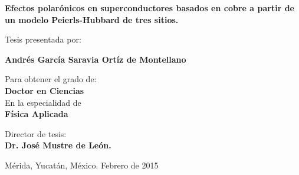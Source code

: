 \bs\bs\bs\bs
\begin{center}
  {\large \bf \bs \bf 
    \hspace{-2.8cm}
    \textsf{Efectos polarónicos en superconductores basados en cobre a partir de un modelo Peierls-Hubbard de tres sitios.}}
\end{center}
\bs\bs\bs
\begin{center}
  {\large 
    \hspace{-2.8cm}
    \textsf{Tesis presentada por:}}
\end{center}
\bs\bs
\begin{center}
  {\large \bf 
    \hspace{-2.8cm}
    \textsf{Andrés García Saravia Ortíz de Montellano}} 
\end{center}
\bs
\begin{center} 
  {\large 
    \hspace{-2.8cm}
    \textsf{Para obtener el grado de:}} \\ 
  \bs \smallskip 
  {\large \bf 
    \hspace{-2.8cm}
    \textsf{Doctor en Ciencias}}\\ 
  \bs 
  {\large 
    \hspace{-2.8cm}
    \textsf{En la especialidad de}} \\
  \bs
  {\bf \large 
    \hspace{-2.8cm}
    \textsf{Física Aplicada}}
\end{center}
\bs\bs\bs
\begin{center}
  \large{\hspace{-2.8cm}
    \textsf{Director de tesis: \\
      \smallskip 
      \hspace{-2.8cm}
      \textbf{Dr. José Mustre de León.}}} \\
\end{center}
\bs\bs\bs\bs\bs\bs\bs
\begin{center}
  {\large 
    \hspace{-2.8cm}
    \textsf{Mérida, Yucatán, México.
      \hspace{5.3cm} Febrero de 2015}}
\end{center}
